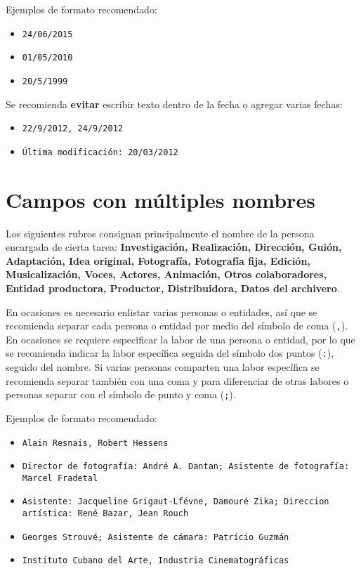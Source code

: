 \documentclass[10pt,letterpaper]{article}
\begin{document}
Ejemplos de formato recomendado:
{\color{Blue}
\begin{itemize}
	\item \texttt{24/06/2015}
	\item \texttt{01/05/2010}
	\item \texttt{20/5/1999}
\end{itemize}
}

Se recomienda \textbf{evitar} escribir texto dentro de la fecha o agregar varias fechas:
{\color{Red}
\begin{itemize}
	\item \texttt{22/9/2012, 24/9/2012}
	\item \texttt{Última modificación: 20/03/2012}
\end{itemize}
}

\section{Campos con múltiples nombres}
Los siguientes rubros consignan principalmente el nombre de la persona encargada de cierta tarea: \textbf{Investigación, Realización, Dirección, Guión, Adaptación, Idea original, Fotografía, Fotografía fija, Edición, Musicalización, Voces, Actores, Animación, Otros colaboradores, Entidad productora, Productor, Distribuidora, Datos del archivero}. 

En ocasiones es necesario enlistar varias personas o entidades, así que se recomienda separar cada persona o entidad por medio del símbolo de coma (\verb|,|). En ocasiones se requiere especificar la labor de una persona o entidad, por lo que se recomienda indicar la labor específica seguida del símbolo dos puntos (\verb|:|), seguido del nombre. Si varias personas comparten una labor específica se recomienda separar también con una coma y para diferenciar de otras labores o personas separar con el símbolo de punto y coma (\verb|;|). 

Ejemplos de formato recomendado:
{\color{Blue}
\begin{itemize}
	\item \texttt{Alain Resnais, Robert Hessens}
	\item \texttt{Director de fotografía: André A. Dantan; Asistente de fotografía: Marcel Fradetal}
	\item \texttt{Asistente: Jacqueline Grigaut-Lfévne, Damouré Zika; Direccion artística: René Bazar, Jean Rouch}
	\item \texttt{Georges Strouvé; Asistente de cámara: Patricio Guzmán}
	\item \texttt{Instituto Cubano del Arte, Industria Cinematográficas}
\end{itemize}
}
\end{document}
